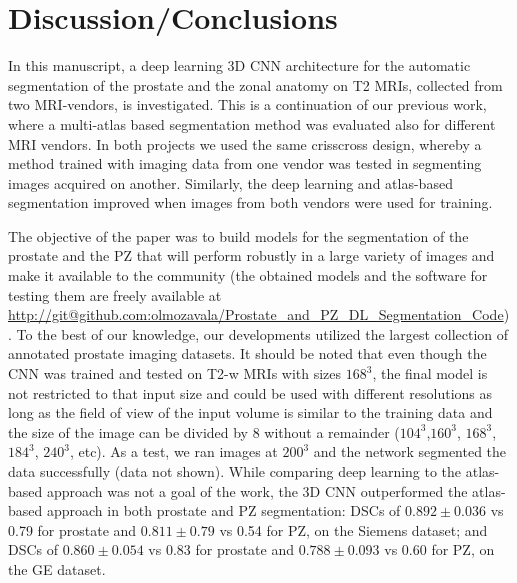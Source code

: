 \section{Discussion/Conclusions}
\label{sec:disc}
In this manuscript, a deep learning 3D CNN architecture for the automatic segmentation of the prostate and the zonal anatomy on T2 MRIs, collected from two MRI-vendors, is investigated. This is a continuation of our previous work, where a multi-atlas based segmentation method was evaluated also for different MRI vendors. In both projects we used the same crisscross design, whereby a method trained with imaging data from one vendor was tested in segmenting images acquired on another. Similarly, the deep learning and atlas-based segmentation improved when images from both vendors were used for training. 

The objective of the paper was to build models for the segmentation of the prostate and the PZ that will perform robustly in a large variety of images and make it available to the community (the obtained models and the software for testing them are freely available at \url{http://git@github.com:olmozavala/Prostate_and_PZ_DL_Segmentation_Code}). To the best of our knowledge, our developments utilized the largest collection of annotated prostate imaging datasets. It should be noted that even though the CNN was trained and tested on T2-w MRIs with sizes $168^3$, the final model is not restricted to that input size and could be used with different resolutions as long as the field of view of the input volume is similar to the training data and the size of the image can be divided by 8 without a remainder ($104^3$,$160^3$, $168^3$, $184^3$, $240^3$, etc). As a test, we ran images at $200^3$ and the network segmented the data successfully (data not shown). While comparing deep learning to the atlas-based approach was not a goal of the work, the 3D CNN outperformed the atlas-based approach in both prostate and PZ segmentation: DSCs of $0.892\pm0.036$ vs 0.79 for prostate and $0.811\pm0.79$ vs 0.54 for PZ, on the Siemens dataset; and DSCs of $0.860\pm0.054$ vs 0.83 for prostate and $0.788\pm0.093$ vs 0.60 for PZ, on the GE dataset.

